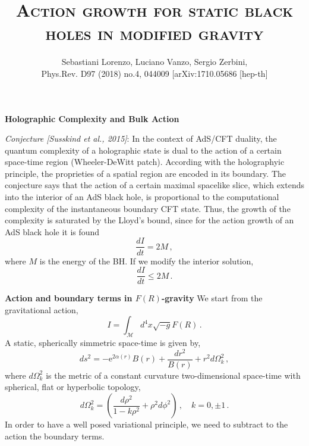 \documentclass[ignorenonframetext,slidestop,compress]{beamer}
\title{\textsc{Action growth for static black holes in modified gravity}}
\author{Sebastiani Lorenzo, Luciano Vanzo, Sergio Zerbini,\\ Phys.Rev. D97 (2018) no.4, 044009 [arXiv:1710.05686 [hep-th]}
\date{}
\begin{document}
\frame{\maketitle}

\begin{frame}
{\bf Holographic Complexity and Bulk Action}

\textit{Conjecture [Susskind et al., 2015]}:
In  the  context  of  AdS/CFT  duality, the quantum complexity of a holographic state is dual to the action of a certain space-time region (Wheeler-DeWitt patch).
According with the holographyic principle, the proprieties of a spatial region are encoded in its boundary.
The  conjecture  says 
that the action 
of a certain maximal spacelike slice, which extends into the interior of an AdS black
hole,  is  proportional  to  the  computational  complexity  of  the  instantaneous
boundary  CFT state. Thus, the growth of the complexity is saturated by the Lloyd's bound,
since for the action growth of an AdS black hole it is found
\begin{equation*}
\frac{d I}{dt}=2M\,, 
\end{equation*}
where  $M$ is the energy of the BH. If we modify the interior solution, 
\begin{equation*}
\frac{d I}{dt}\leq 2M\,.
\end{equation*}

\end{frame}


\begin{frame}
{\bf Action and boundary terms in $F(R)$-gravity}
We start from the gravitational action,   
\begin{equation*}
 I=\int_\mathcal{M} d^4 x\sqrt{-g}F(R)\,.\label{action0}
\end{equation*}
A static, spherically simmetric space-time is given by,
\begin{equation*}
 ds^2=-\text{e}^{2\alpha(r)}B(r)+\frac{dr^2}{B(r)}+r^2d\Omega^2_k\,,
\end{equation*}
where $d\Omega^2_k$ is the metric of a constant curvature two-dimensional space-time with spherical, flat or hyperbolic topology,
\begin{equation*}
d\Omega_k^2=\left(\frac{d\rho^2}{1-k\rho^2}+\rho^2 d\phi^2\right)\,,\quad k=0,\pm 1\,.
\end{equation*}
In order to have a well posed variational principle, we need to subtract to the action the boundary terms.

\end{frame}
\end{document}
